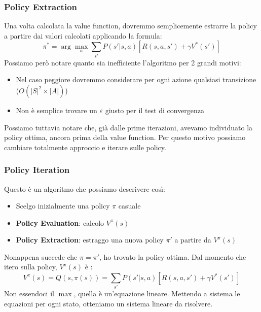 \subsubsection{Policy Extraction}
Una volta calcolata la value function, dovremmo semplicemente estrarre la policy a partire dai valori calcolati applicando la formula:
\begin{equation}
    \pi^* = \arg \max_a \sum_{s'} P(s' | s,a)[R(s,a,s') + \gamma V^*(s')]
\end{equation}
Possiamo però notare quanto sia inefficiente l'algoritmo per 2 grandi motivi:
\begin{itemize}
    \item Nel caso peggiore dovremmo considerare per ogni azione qualsiasi transizione ($O(|S|^2 \times |A|)$)
    \item Non è semplice trovare un $\varepsilon$ giusto per il test di convergenza
\end{itemize}
Possiamo tuttavia notare che, già dalle prime iterazioni, avevamo individuato la policy ottima, ancora prima della value function.
Per questo motivo possiamo cambiare totalmente approccio e iterare sulle policy.

\subsubsection{Policy Iteration}
Questo è un algoritmo che possiamo descrivere così:
\begin{itemize}
    \item Scelgo inizialmente una policy $\pi$ casuale
    \item \textbf{Policy Evaluation}: calcolo $V^\pi (s)$
    \item \textbf{Policy Extraction}: estraggo una nuova policy $\pi'$ a partire da $V^\pi (s)$
\end{itemize}
Nonappena succede che $\pi = \pi'$, ho trovato la policy ottima. Dal momento che itero sulla policy, $V^\pi(s)$ è :
\begin{equation}
    V^\pi(s) = Q(s,\pi(s)) = \sum_{s'} P(s' | s,a)[R(s,a,s') + \gamma V^*(s')]
\end{equation}
Non essendoci il $\max$, quella è un'equazione lineare. Mettendo a sistema le equazioni per ogni stato, otteniamo un sistema lineare
da risolvere.

